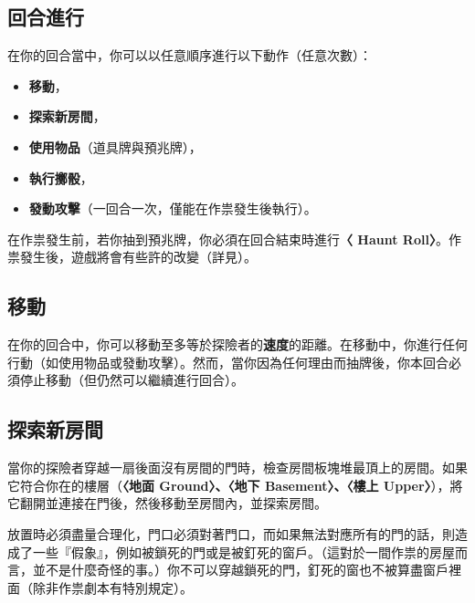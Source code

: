 
\subsection{回合進行} \label{ssec:on-your-turn}

在你的回合當中，你可以以任意順序進行以下動作（任意次數）：
\begin{itemize}
  \item \textbf{移動}，
  \item \textbf{探索新房間}，
  \item \textbf{使用物品}（道具牌與預兆牌），
  \item \textbf{執行擲骰}，
  \item \textbf{發動攻擊}（一回合一次，僅能在作祟發生後執行）。
\end{itemize}
在作祟發生前，若你抽到預兆牌，你必須在回合結束時進行\textbf{〈 Haunt Roll〉}。作祟發生後，遊戲將會有些許的改變（詳見）。


\subsection{移動} \label{ssec:move}

在你的回合中，你可以移動至多等於探險者的\textbf{速度}的距離。在移動中，你進行任何行動（如使用物品或發動攻擊）。然而，當你因為任何理由而抽牌後，你本回合必須停止移動（但仍然可以繼續進行回合）。


\subsection{探索新房間} \label{ssec:discover-a-new-room}

當你的探險者穿越一扇後面沒有房間的門時，檢查房間板塊堆最頂上的房間。如果它符合你在的樓層（\textbf{〈地面 Ground〉、〈地下 Basement〉、〈樓上 Upper〉}），將它翻開並連接在門後，然後移動至房間內，並探索房間。

放置時必須盡量合理化，門口必須對著門口，而如果無法對應所有的門的話，則造成了一些『假象』，例如被鎖死的門或是被釘死的窗戶。（這對於一間作祟的房屋而言，並不是什麼奇怪的事。）你不可以穿越鎖死的門，釘死的窗也不被算盡窗戶裡面（除非作祟劇本有特別規定）。

